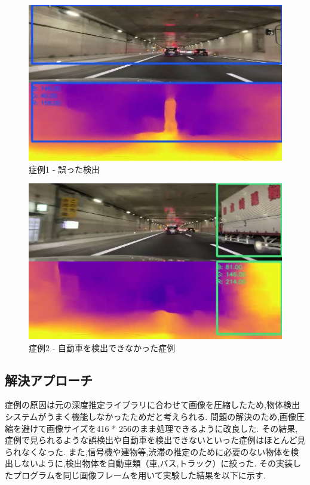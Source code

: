 \newpage
\begin{figure}[htbp]
  \begin{center}
   \includegraphics[width=12cm]{figs/miss_1.png}
  \end{center}
  \caption{症例1 - 誤った検出}
  \label{fig:miss1}
\end{figure}

\begin{figure}[hbtp]
 \begin{center}
  \includegraphics[width=12cm]{figs/miss_2.png}
 \end{center}
  \caption{症例2 - 自動車を検出できなかった症例}
  \label{fig:miss2}
\end{figure}

\newpage

\subsection{解決アプローチ}
症例の原因は元の深度推定ライブラリに合わせて画像を圧縮したため,物体検出システムがうまく機能しなかったためだと考えられる.
問題の解決のため,画像圧縮を避けて画像サイズを416 * 256のまま処理できるように改良した.
その結果,症例で見られるような誤検出や自動車を検出できないといった症例はほとんど見られなくなった.
また,信号機や建物等,渋滞の推定のために必要のない物体を検出しないように,検出物体を自動車類（車,バス,トラック）に絞った.
その実装したプログラムを同じ画像フレームを用いて実験した結果を以下に示す.


